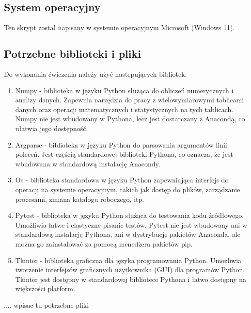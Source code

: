 \documentclass[10pt,a4paper]{article}
\begin{document}
	\subsection{System operacyjny}
	
	Ten skrypt został napisany w systemie operacyjnym Microsoft (Windows 11).
	
	\subsection{Potrzebne biblioteki i pliki}
	
	Do wykonania ćwiczenia należy użyć następujących bibliotek:
	\begin{enumerate}

	\item Numpy - biblioteka w języku Python służąca do obliczeń numerycznych i analizy danych. Zapewnia narzędzia do pracy z wielowymiarowymi tablicami danych oraz operacji matematycznych i statystycznych na tych tablicach. Numpy nie jest wbudowany w Pythona, lecz jest dostarczany z Anacondą, co ułatwia jego dostępność.
	\item Argparse - biblioteka w języku Python do parsowania argumentów linii poleceń. Jest częścią standardowej biblioteki Pythona, co oznacza, że jest wbudowana w standardową instalację Anacondy.
	\item Os - biblioteka standardowa w języku Python zapewniająca interfejs do operacji na systemie operacyjnym, takich jak dostęp do plików, zarządzanie procesami, zmiana katalogu roboczego, itp.	
	\item Pytest - biblioteka w języku Python służąca do testowania kodu źródłowego. Umożliwia łatwe i elastyczne pisanie testów. Pytest nie jest wbudowany ani w standardową instalację Pythona, ani w dystrybucję pakietów Anaconda, ale można go zainstalować za pomocą menedżera pakietów pip.
	\item Tkinter - biblioteka graficzna dla języka programowania Python. Umożliwia tworzenie interfejsów graficznych użytkownika (GUI) dla programów Python. Tkinter jest dostępny w standardowej bibliotece Pythona i łatwo dostępny na większości platform.
		
	\end{enumerate}
	
.... wpisac tu potrzebne pliki

		
\end{document}
